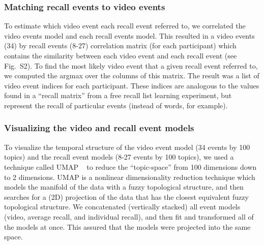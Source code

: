 \documentclass{article}
\begin{document}
\subsubsection*{Matching recall events to video events}
To estimate which video event each recall event referred to, we correlated the video events model and each recall events model. This resulted in a video events (34) by recall events (8-27) correlation matrix (for each participant) which contains the similarity between each video event and each recall event (see Fig.~S2).  To find the most likely video event that a given recall event referred to, we computed the argmax over the columns of this matrix.  The result was a list of video event indices for each participant. These indices are analogous to the values found in a ``recall matrix'' from a free recall list learning experiment, but represent the recall of particular events (instead of words, for example).

\subsubsection*{Visualizing the video and recall event models}
To visualize the temporal structure of the video event model (34 events by 100 topics) and the recall event models (8-27 events by 100 topics), we used a technique called UMAP ~\citep{McInHeal18} to reduce the ``topic-space'' from 100 dimensions down to 2 dimensions. UMAP is a nonlinear dimensionality reduction technique which models the manifold of the data with a fuzzy topological structure, and then searches for a (2D) projection of the data that has the closest equivalent fuzzy topological structure. We concatenated (vertically stacked) all event models (video, average recall, and individual recall), and then fit and transformed all of the models at once. This assured that the models were projected into the same space.
\end{document}
